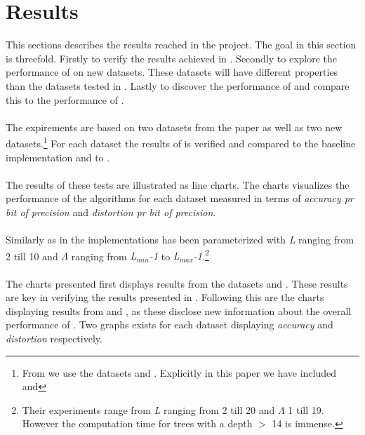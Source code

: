 \section{Results}
\label{results}
This sections describes the results reached in the project. The goal in this section is threefold. Firstly to verify the results achieved in \cite{wagner17}. Secondly to explore the performance of \qs{} on new datasets. These datasets will have different properties than the datasets tested in \cite{wagner17}. Lastly to discover the performance of \qsr{} and compare this to the performance of \qs{}. 
\\
\\
The expirements are based on two datasets from the paper as well as two new datasets.\footnote{From \cite{wagner17} we use the datasets \sift{} and \mnist{}. Explicitly in this paper we have included \clust{} and \gist{}} For each dataset the results of \qs{} is verified and compared to the baseline implementation \gr{} and to \qsr{}. 
\\
\\
The results of these tests are illustrated as line charts. The charts visualizes the performance of the algorithms for each dataset measured in terms of \textit{accuracy pr bit of precision} and \textit{distortion pr bit of precision}. 
\\
\\
Similarly as in \cite{wagner17} the \qs{} implementations has been parameterized with \textit{L} ranging from 2 till 10 and $\Lambda$ ranging from \textit{L$_{min}$-1} to \textit{L$_{max}$-1}.\footnote{Their experiments range from \textit{L} ranging from 2 till 20 and $\Lambda$ 1 till 19. However the computation time for trees with a depth $>$ 14 is immense.} 
\\
\\
The charts presented first displays results from the datasets \mnist{} and \sift{}. These results are key in verifying the results presented in \cite{wagner17}. Following this are the charts displaying results from \clust{} and \gist{}, as these disclose new information about the overall performance of \qs{}. Two graphs exists for each dataset displaying \textit{accuracy} and \textit{distortion} respectively.
